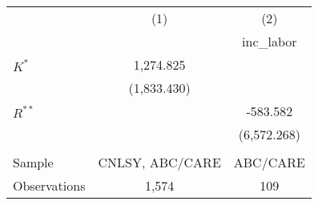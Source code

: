 
\begin{tabular}{lcc} \toprule
 & (1) & (2) \\
&  & inc\_labor \\ \midrule
$K^*$ & 1,274.825 &  \\
 & (1,833.430) &  \\
$R^{**}$ &  & -583.582 \\
 &  & (6,572.268) \\ \\ \midrule
Sample          & CNLSY, ABC/CARE & ABC/CARE \\ 
Observations & 1,574 & 109 \\ \bottomrule
\end{tabular}
